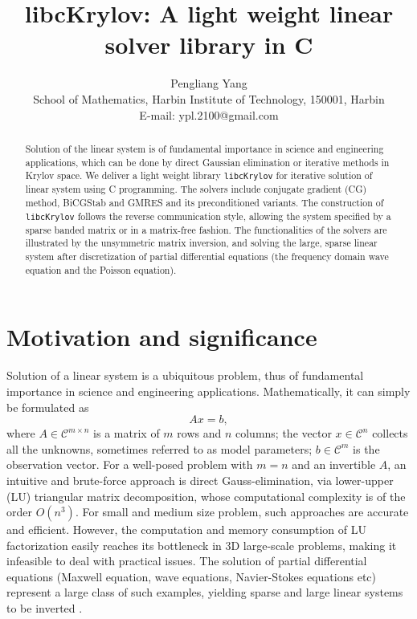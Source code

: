 \documentclass[10pt]{article}
\title{libcKrylov: A light weight linear solver library in C}
\author{Pengliang Yang\\
School of Mathematics, Harbin Institute of Technology, 150001, Harbin\\
E-mail: ypl.2100@gmail.com}
\begin{document}
\maketitle

\begin{abstract}

  Solution of the linear system is of fundamental importance in science and engineering applications, which can be done by direct Gaussian elimination  or iterative methods in Krylov space. We deliver a light weight library  \verb|libcKrylov| for iterative solution of linear system using C programming. The solvers include conjugate gradient (CG) method, BiCGStab and GMRES and its preconditioned variants. The construction of \verb|libcKrylov| follows the reverse communication style, allowing the system specified by a sparse banded matrix or in a matrix-free fashion. The functionalities of the solvers are illustrated by the unsymmetric matrix inversion, and solving the large, sparse linear system after discretization of partial differential equations (the frequency domain wave equation and the Poisson equation). 

\end{abstract}



\section{Motivation and significance}

Solution of a linear system is a ubiquitous problem, thus of fundamental importance in science and engineering applications. Mathematically, it can simply be formulated as
\begin{equation}\label{eq:axb}
Ax = b,
\end{equation}
where $A \in \mathcal{C}^{m\times n}$ is a matrix of $m$ rows and $n$ columns; the vector $x\in \mathcal{C}^n$ collects all the unknowns, sometimes referred to as model parameters; $b\in \mathcal{C}^m$ is the observation vector. For a well-posed problem with $m=n$ and an invertible $A$, an intuitive and brute-force approach is direct Gauss-elimination, via lower-upper (LU) triangular matrix decomposition, whose computational complexity is of the order $O(n^3)$.  For small and medium size problem, such approaches are accurate and efficient. However, the computation and memory consumption of LU factorization easily reaches its bottleneck in 3D large-scale problems, making it infeasible to deal with practical issues. The solution of partial differential equations (Maxwell equation, wave equations, Navier-Stokes equations etc) represent a large class of such examples, yielding sparse and large linear systems to be inverted \citep{Saad_2003_IMS}.
\end{document}
